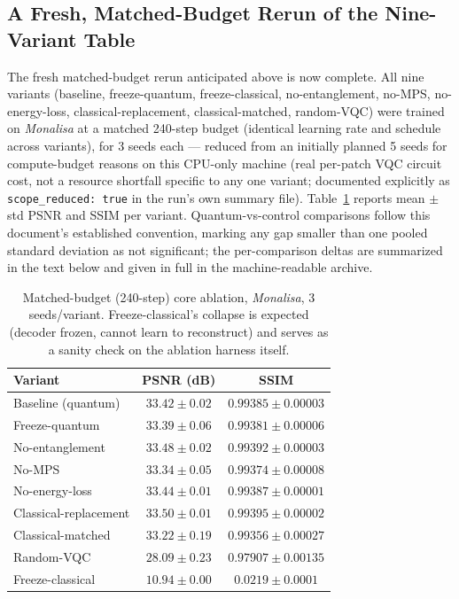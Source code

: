 \documentclass[11pt]{article}
\begin{document}
\subsection{A Fresh, Matched-Budget Rerun of the Nine-Variant Table}
\label{sec:core_multiseed_rerun}
The fresh matched-budget rerun anticipated above is now complete. All nine variants (baseline, freeze-quantum, freeze-classical, no-entanglement, no-MPS, no-energy-loss, classical-replacement, classical-matched, random-VQC) were trained on \textit{Monalisa} at a matched 240-step budget (identical learning rate and schedule across variants), for 3 seeds each --- reduced from an initially planned 5 seeds for compute-budget reasons on this CPU-only machine (real per-patch VQC circuit cost, not a resource shortfall specific to any one variant; documented explicitly as \texttt{scope\_reduced: true} in the run's own summary file). Table~\ref{tab:core_multiseed_240} reports mean $\pm$ std PSNR and SSIM per variant. Quantum-vs-control comparisons follow this document's established convention, marking any gap smaller than one pooled standard deviation as not significant; the per-comparison deltas are summarized in the text below and given in full in the machine-readable archive.

\begin{table}[H]
\centering
\caption{Matched-budget (240-step) core ablation, \textit{Monalisa}, 3 seeds/variant. Freeze-classical's collapse is expected (decoder frozen, cannot learn to reconstruct) and serves as a sanity check on the ablation harness itself.}
\label{tab:core_multiseed_240}
\scriptsize
\begin{tabular}{lcc}
\toprule
Variant & PSNR (dB) & SSIM \\
\midrule
Baseline (quantum) & $33.42\pm0.02$ & $0.99385\pm0.00003$ \\
Freeze-quantum & $33.39\pm0.06$ & $0.99381\pm0.00006$ \\
No-entanglement & $33.48\pm0.02$ & $0.99392\pm0.00003$ \\
No-MPS & $33.34\pm0.05$ & $0.99374\pm0.00008$ \\
No-energy-loss & $33.44\pm0.01$ & $0.99387\pm0.00001$ \\
Classical-replacement & $33.50\pm0.01$ & $0.99395\pm0.00002$ \\
Classical-matched & $33.22\pm0.19$ & $0.99356\pm0.00027$ \\
Random-VQC & $28.09\pm0.23$ & $0.97907\pm0.00135$ \\
Freeze-classical & $10.94\pm0.00$ & $0.0219\pm0.0001$ \\
\bottomrule
\end{tabular}
\end{table}
\end{document}
